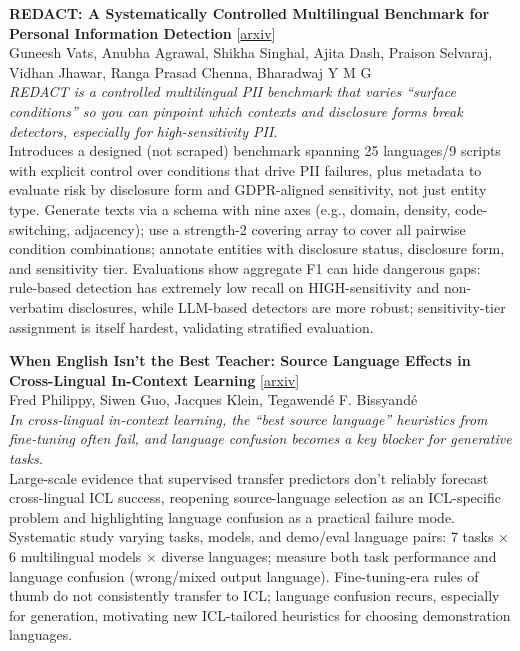 \documentclass[12pt,letterpaper]{article}
\begin{document}
\medskip

{\small\textbf{REDACT: A Systematically Controlled Multilingual Benchmark for Personal Information Detection}} {\scriptsize[\href{https://arxiv.org/abs/2606.19881}{arxiv}]}\\
{\scriptsize Guneesh Vats, Anubha Agrawal, Shikha Singhal, Ajita Dash, Praison Selvaraj, Vidhan Jhawar, Ranga Prasad Chenna, Bharadwaj Y M G}\\

{\small\textit{REDACT is a controlled multilingual PII benchmark that varies ``surface conditions'' so you can pinpoint which contexts and disclosure forms break detectors, especially for high-sensitivity PII.}}\\[1pt]
{\footnotesize Introduces a designed (not scraped) benchmark spanning 25 languages/9 scripts with explicit control over conditions that drive PII failures, plus metadata to evaluate risk by disclosure form and GDPR-aligned sensitivity, not just entity type. Generate texts via a schema with nine axes (e.g., domain, density, code-switching, adjacency); use a strength-2 covering array to cover all pairwise condition combinations; annotate entities with disclosure status, disclosure form, and sensitivity tier. Evaluations show aggregate F1 can hide dangerous gaps: rule-based detection has extremely low recall on HIGH-sensitivity and non-verbatim disclosures, while LLM-based detectors are more robust; sensitivity-tier assignment is itself hardest, validating stratified evaluation.}

\medskip

{\small\textbf{When English Isn't the Best Teacher: Source Language Effects in Cross-Lingual In-Context Learning}} {\scriptsize[\href{https://arxiv.org/abs/2606.18033}{arxiv}]}\\
{\scriptsize Fred Philippy, Siwen Guo, Jacques Klein, Tegawendé F. Bissyandé}\\

{\small\textit{In cross-lingual in-context learning, the ``best source language'' heuristics from fine-tuning often fail, and language confusion becomes a key blocker for generative tasks.}}\\[1pt]
{\footnotesize Large-scale evidence that supervised transfer predictors don't reliably forecast cross-lingual ICL success, reopening source-language selection as an ICL-specific problem and highlighting language confusion as a practical failure mode. Systematic study varying tasks, models, and demo/eval language pairs: 7 tasks × 6 multilingual models × diverse languages; measure both task performance and language confusion (wrong/mixed output language). Fine-tuning-era rules of thumb do not consistently transfer to ICL; language confusion recurs, especially for generation, motivating new ICL-tailored heuristics for choosing demonstration languages.}
\end{document}
